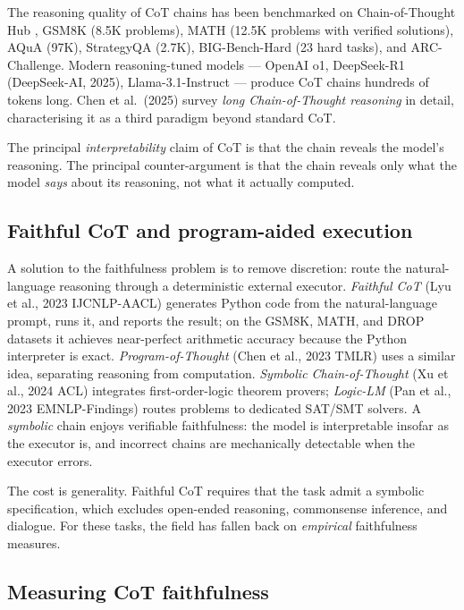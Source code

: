 \documentclass{article}
\begin{document}
The reasoning quality of CoT chains has been benchmarked on Chain-of-Thought Hub \citep{fu2023chainofthoughthuba}, GSM8K (8.5K problems), MATH (12.5K problems with verified solutions), AQuA (97K), StrategyQA (2.7K), BIG-Bench-Hard (23 hard tasks), and ARC-Challenge. Modern reasoning-tuned models --- OpenAI o1, DeepSeek-R1 (DeepSeek-AI, 2025), Llama-3.1-Instruct --- produce CoT chains hundreds of tokens long. Chen et al.~(2025) survey \emph{long Chain-of-Thought reasoning} in detail, characterising it as a third paradigm beyond standard CoT.

The principal \emph{interpretability} claim of CoT is that the chain reveals the model's reasoning. The principal counter-argument is that the chain reveals only what the model \emph{says} about its reasoning, not what it actually computed.

\subsection{Faithful CoT and program-aided execution}\label{faithful-cot-and-program-aided-execution}

A solution to the faithfulness problem is to remove discretion: route the natural-language reasoning through a deterministic external executor. \emph{Faithful CoT} (Lyu et al., 2023 IJCNLP-AACL) generates Python code from the natural-language prompt, runs it, and reports the result; on the GSM8K, MATH, and DROP datasets it achieves near-perfect arithmetic accuracy because the Python interpreter is exact. \emph{Program-of-Thought} (Chen et al., 2023 TMLR) uses a similar idea, separating reasoning from computation. \emph{Symbolic Chain-of-Thought} (Xu et al., 2024 ACL) integrates first-order-logic theorem provers; \emph{Logic-LM} (Pan et al., 2023 EMNLP-Findings) routes problems to dedicated SAT/SMT solvers. A \emph{symbolic} chain enjoys verifiable faithfulness: the model is interpretable insofar as the executor is, and incorrect chains are mechanically detectable when the executor errors.

The cost is generality. Faithful CoT requires that the task admit a symbolic specification, which excludes open-ended reasoning, commonsense inference, and dialogue. For these tasks, the field has fallen back on \emph{empirical} faithfulness measures.

\subsection{Measuring CoT faithfulness}\label{measuring-cot-faithfulness}
\end{document}
